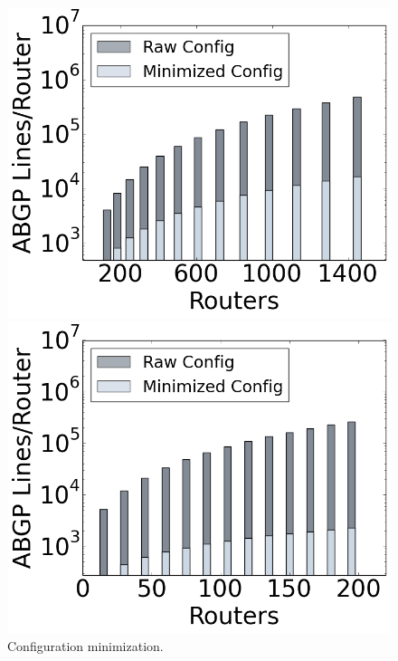 \begin{figure}[t!]
  \centering
  \begin{minipage}[b]{0.45\linewidth}
    \includegraphics[width=1.1\columnwidth]{figures/config-compression-dc.png}
  \end{minipage}
  \quad
  \begin{minipage}[b]{0.45\linewidth}
    \includegraphics[width=1.1\columnwidth]{figures/config-compression-backbone.png}
  \end{minipage}
  \caption{Configuration minimization.}
  \label{fig:config-minimization}
\end{figure}

